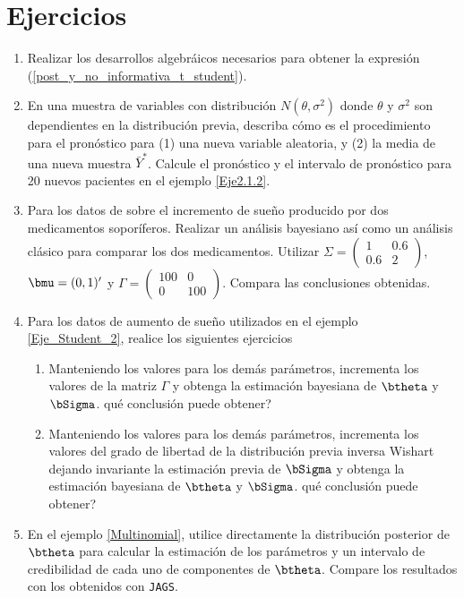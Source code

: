                                       
\section{Ejercicios}
\begin{enumerate}
\item Realizar los desarrollos algebráicos necesarios para obtener la expresión (\ref{post_y_no_informativa_t_student}).
\item En una muestra de variables con distribución $N(\theta,\sigma^2)$ donde $\theta$ y $\sigma^2$ son dependientes en la distribución previa, describa cómo es el procedimiento para el pronóstico para (1) una nueva variable aleatoria, y (2) la media de una nueva muestra $\bar{Y}^*$. Calcule el pronóstico y el intervalo de pronóstico para 20 nuevos pacientes en el ejemplo \ref{Eje2.1.2}.
\item Para los datos de  sobre el incremento de sueño producido por dos medicamentos soporíferos. Realizar un análisis bayesiano así como un análisis clásico para comparar los dos medicamentos. Utilizar $\Sigma=\begin{pmatrix}1&0.6\\ 0.6&2\end{pmatrix}$, $\bmu=(0,1)'$ y $\Gamma=\begin{pmatrix}100&0\\ 0&100\end{pmatrix}$. Compara las conclusiones obtenidas.
\item Para los datos de aumento de sueño utilizados en el ejemplo \ref{Eje_Student_2}, realice los siguientes ejercicios
\begin{enumerate}
  \item Manteniendo los valores para los demás parámetros, incrementa los valores de la matriz $\Gamma$ y obtenga la estimación bayesiana de $\btheta$ y $\bSigma$. qué conclusión puede obtener?
  \item Manteniendo los valores para los demás parámetros, incrementa los valores del grado de libertad de la distribución previa inversa Wishart dejando invariante la estimación previa de $\bSigma$ y obtenga la estimación bayesiana de $\btheta$ y $\bSigma$. qué conclusión puede obtener?
\end{enumerate}
\item En el ejemplo \ref{Multinomial}, utilice directamente la distribución posterior de $\btheta$ para calcular la estimación de los parámetros y un intervalo de credibilidad de cada uno de componentes de $\btheta$. Compare los resultados con los obtenidos con \verb'JAGS'.
\end{enumerate}


